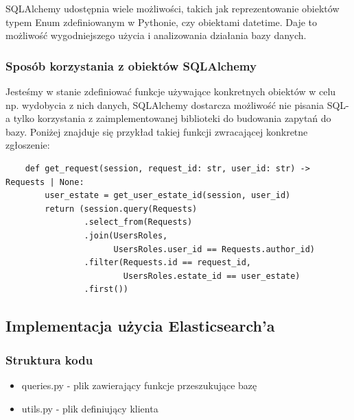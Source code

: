 SQLAlchemy udostępnia wiele możliwości, takich jak reprezentowanie obiektów typem Enum zdefiniowanym w Pythonie, czy obiektami datetime. Daje to możliwość wygodniejszego użycia i analizowania działania bazy danych.

\subsubsection{Sposób korzystania z obiektów SQLAlchemy}
Jesteśmy w stanie zdefiniować funkcje używające konkretnych obiektów w celu np. wydobycia z nich danych, SQLAlchemy dostarcza możliwość nie pisania SQL-a tylko korzystania z zaimplementowanej biblioteki do budowania zapytań do bazy. Poniżej znajduje się przykład takiej funkcji zwracającej konkretne zgłoszenie:

\begin{verbatim}
    def get_request(session, request_id: str, user_id: str) -> Requests | None:
        user_estate = get_user_estate_id(session, user_id)
        return (session.query(Requests)
                .select_from(Requests)
                .join(UsersRoles, 
                      UsersRoles.user_id == Requests.author_id)
                .filter(Requests.id == request_id,
                        UsersRoles.estate_id == user_estate)
                .first())
\end{verbatim}

\subsection{Implementacja użycia Elasticsearch'a}
\subsubsection{Struktura kodu}
\begin{itemize}
    \item queries.py - plik zawierający funkcje przeszukujące bazę
    \item utils.py - plik definiujący klienta
\end{itemize}
